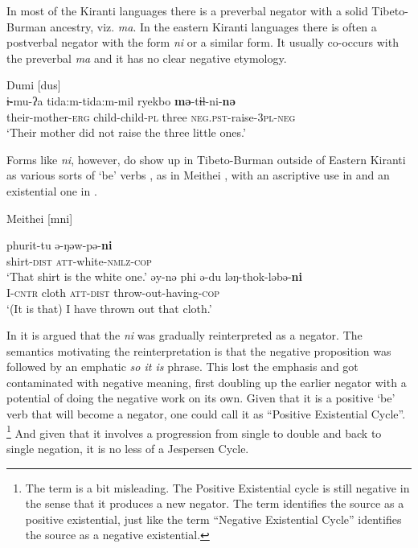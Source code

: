 ﻿\documentclass[output=paper]{langsci/langscibook}
\begin{document}
In most of the Kiranti languages there is a preverbal negator with a solid
Tibeto-Burman ancestry, viz. \textit{ma}. In the eastern Kiranti languages
there is often a postverbal negator with the form \textit{ni} or a similar
form. It usually co-occurs with the preverbal \textit{ma} and it has no
clear negative etymology.
%
\begin{exe}\ex\label{ex:int-dumi-mother}
Dumi [dus] \\
    \gll i̶-mu-ʔa  tida:m-tida:m-mil  ryekbo
    \textbf{mə}-ti̶̶l-ni-\textbf{nə} \\
      their-mother-\textsc{erg}  child-child-\textsc{pl}  three 
    \textsc{neg.pst}-raise-\textsc{3pl-neg} \\
    \glt `Their mother did not raise the three little ones.'
    \end{exe}
%
Forms like \textit{ni}, however, do show up in Tibeto-Burman outside of
Eastern Kiranti as various sorts of `be' verbs \parencite{Lowes2006}, as in
Meithei \parencite[249--250, 297]{Chelliah1997}, with an ascriptive use in
 and an existential one in
.

\begin{exe}\ex Meithei [mni]
\begin{xlist}
    \ex\label{ex:int-meithei-shirt}
    \gll phurit-tu  ə-ŋəw-pə-\textbf{ni} \\
    shirt-\textsc{dist}  \textsc{att}-white-\textsc{nmlz-cop}\\
    \glt `That shirt is the white one.'
    \ex\label{ex:int-meithei-cloth}
    \gll əy-nə    phi  ə-du    ləŋ-thok-ləbə-\textbf{ni}\\
I-\textsc{cntr}  cloth  \textsc{att-dist}  throw-out-having-\textsc{cop}\\
    \glt `(It is that) I have thrown out that cloth.'
    \end{xlist}\end{exe}
%
In \textcite{AuweraVossen2017} it is argued that the \textit{ni} was
gradually reinterpreted as a negator. The semantics motivating the
reinterpretation is that the negative proposition was followed by an
emphatic \textit{so it is} phrase. This lost the emphasis
and got contaminated with negative meaning, first doubling up the earlier
negator with a potential of doing the negative work on its own. Given that
it is a positive `be' verb that will become a negator, one could call it as
``Positive Existential Cycle''.%
%
\footnote{The term is a bit misleading. The Positive Existential cycle is
still negative in the sense that it produces a new negator. The term
identifies the source as a positive existential, just like the term
``Negative Existential Cycle'' identifies the source as a negative
existential.} %
%
And given that it involves a progression from single to double and back to
single negation, it is no less of a Jespersen Cycle.
\end{document}
